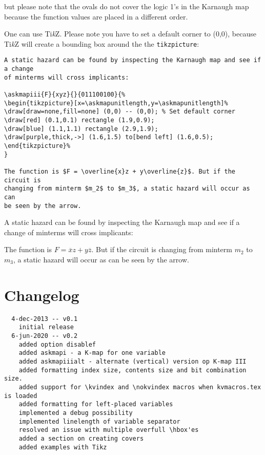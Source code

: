 \documentclass[a4paper,10pt]{ltxdoc}
\begin{document}
\bigskip
but please note that the ovals do not cover the logic 1's in the Karnaugh map
because the function values are placed in a different order.

One can use Ti\textsl{k}Z. Please note you have to set a default corner to
(0,0), because Ti\textsl{k}Z will create a bounding box around the the
\texttt{tikzpicture}:

\begin{verbatim}
A static hazard can be found by inspecting the Karnaugh map and see if a change
of minterms will cross implicants:

\askmapiii{F}{xyz}{}{011100100}{%
\begin{tikzpicture}[x=\askmapunitlength,y=\askmapunitlength]%
\draw[draw=none,fill=none] (0,0) -- (0,0); % Set default corner
\draw[red] (0.1,0.1) rectangle (1.9,0.9);
\draw[blue] (1.1,1.1) rectangle (2.9,1.9);
\draw[purple,thick,->] (1.6,1.5) to[bend left] (1.6,0.5);
\end{tikzpicture}%
}

The function is $F = \overline{x}z + y\overline{z}$. But if the circuit is
changing from minterm $m_2$ to $m_3$, a static hazard will occur as can
be seen by the arrow.
\end{verbatim}


A static hazard can be found by inspecting the Karnaugh map and see if a change
of minterms will cross implicants:


The function is $F = \overline{x}z + y\overline{z}$. But if the circuit is
changing from minterm $m_2$ to $m_3$, a static hazard will occur as can
be seen by the arrow.



\section{Changelog}
\label{sec:changelog}
\begin{verbatim}
  4-dec-2013 -- v0.1
    initial release
  6-jun-2020 -- v0.2
    added option disablef
    added askmapi - a K-map for one variable
    added askmapiiialt - alternate (vertical) version op K-map III
    added formatting index size, contents size and bit combination size.
    added support for \kvindex and \nokvindex macros when kvmacros.tex is loaded
    added formatting for left-placed variables
    implemented a debug possibility
    implemented linelength of variable separator
    resolved an issue with multiple overfull \hbox'es
    added a section on creating covers
    added examples with Tikz
\end{verbatim}
\end{document}
